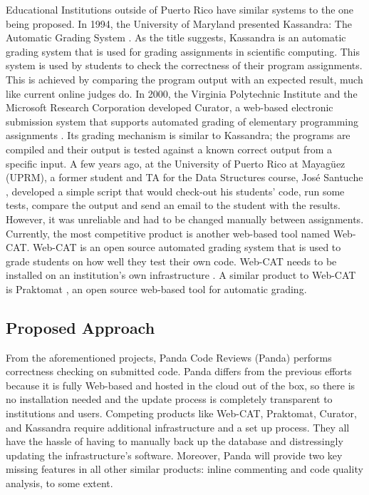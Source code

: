 Educational Institutions outside of Puerto Rico have similar systems to the one
being proposed. In 1994, the University of Maryland presented Kassandra: The
Automatic Grading System \cite{Matt1994}. As the title suggests, Kassandra is an
automatic grading system that is used for grading assignments in scientific
computing. This system is used by students to check the correctness of their
program assignments. This is achieved by comparing the program output with an
expected result, much like current online judges do. In 2000, the Virginia
Polytechnic Institute and the Microsoft Research Corporation developed Curator,
a web-based electronic submission system that supports automated grading of
elementary programming assignments \cite{Curator}. Its grading mechanism is
similar to Kassandra; the programs are compiled and their output is tested
against a known correct output from a specific input. A few years ago, at the
University of Puerto Rico at Mayagüez (UPRM), a former student and TA for the
Data  Structures course, José Santuche \cite{Santuche}, developed a simple
script that would check-out his students' code, run some tests, compare the
output and send an email to the student with the results. However, it was
unreliable and had to be changed manually between assignments. Currently, the
most competitive product is another web-based tool named Web-CAT. Web-CAT is an
open source automated grading system that is used to grade students on how well
they test their own code. Web-CAT needs to be installed on an institution's own
infrastructure \cite{WebCat}. A similar product to Web-CAT is Praktomat
\cite{Praktomat}, an open source web-based tool for automatic grading.

\subsection{Proposed Approach}

From the aforementioned projects, Panda Code Reviews (Panda) performs
correctness checking on submitted code. Panda differs from the previous efforts
because it is fully Web-based and hosted in the cloud out of the box, so there
is no installation needed and the update process is completely transparent to
institutions and users. Competing products like Web-CAT, Praktomat, Curator, and
Kassandra require additional infrastructure and a set up process. They all have
the hassle of having to manually back up the database and distressingly updating
the infrastructure's software. Moreover, Panda will provide two key missing
features in all other similar products: inline commenting and code quality
analysis, to some extent.

